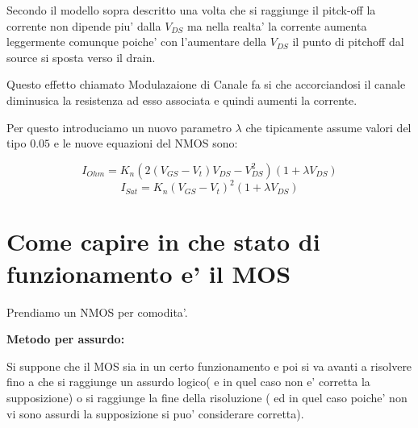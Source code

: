 \documentclass[\main/main.tex]{subfiles}
\begin{document}
Secondo il modello sopra descritto una volta che si raggiunge il pitck-off la corrente non dipende piu' dalla $V_{DS}$ ma nella realta' la corrente aumenta leggermente comunque poiche' con l'aumentare della $V_{DS}$ il punto di pitchoff dal source si sposta verso il drain.

Questo effetto chiamato Modulazaione di Canale fa si che accorciandosi il canale diminusica la resistenza ad esso associata e quindi aumenti la corrente.

Per questo introduciamo un nuovo parametro $\lambda$ che tipicamente assume valori del tipo $0.05$ e le nuove equazioni del NMOS sono:

\[ I_{Ohm} = K_n \left( 2(V_{GS} - V_t) V_{DS} - V_{DS}^2 \right)(1+\lambda V_{DS})\]
\[ I_{Sat} = K_n \left( V_{GS} - V_t \right)^2(1+\lambda V_{DS})\]

\begin{figure}[H]
    \center
\end{figure}

\clearpage
\section{Come capire in che stato di funzionamento e' il MOS}
Prendiamo un NMOS per comodita'.

\textbf{Metodo per assurdo:}

Si suppone che il MOS sia in un certo funzionamento e poi si va avanti a risolvere fino a che si raggiunge un assurdo logico( e in quel caso non e' corretta la supposizione) o si raggiunge la fine della risoluzione ( ed in quel caso poiche' non vi sono assurdi la supposizione si puo' considerare corretta).
\end{document}
